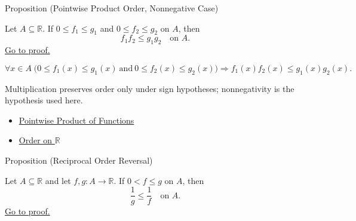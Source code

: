 \begin{propositionbox}{Proposition (Pointwise Product Order, Nonnegative Case)}
\begin{proposition}
\label{prop:pointwise-product-order-nonnegative}
Let \(A\subseteq\mathbb{R}\).  If \(0\leq f_1\leq g_1\) and
\(0\leq f_2\leq g_2\) on \(A\), then
\[
  f_1f_2\leq g_1g_2
  \quad\text{on }A.
\]
\hyperref[prf:pointwise-product-order-nonnegative]{Go to proof.}
\end{proposition}
\end{propositionbox}

\begin{remark*}
\[
  \forall x\in A\;
  \bigl(0\leq f_1(x)\leq g_1(x)\ \text{and}\
  0\leq f_2(x)\leq g_2(x)\bigr)
  \Rightarrow f_1(x)f_2(x)\leq g_1(x)g_2(x).
\]
\end{remark*}

\begin{remark*}[Interpretation]
Multiplication preserves order only under sign hypotheses; nonnegativity is
the hypothesis used here.
\end{remark*}

\begin{dependencies}
\begin{itemize}
  \item \hyperref[def:pointwise-product-of-functions]{Pointwise Product of Functions}
  \item \hyperref[def:order-on-r]{Order on \(\mathbb{R}\)}
\end{itemize}
\end{dependencies}

\begin{propositionbox}{Proposition (Reciprocal Order Reversal)}
\begin{proposition}
\label{prop:reciprocal-order-reversal}
Let \(A\subseteq\mathbb{R}\) and let \(f,g:A\to\mathbb{R}\).  If
\(0<f\leq g\) on \(A\), then
\[
  \frac{1}{g}\leq\frac{1}{f}
  \quad\text{on }A.
\]
\hyperref[prf:reciprocal-order-reversal]{Go to proof.}
\end{proposition}
\end{propositionbox}


